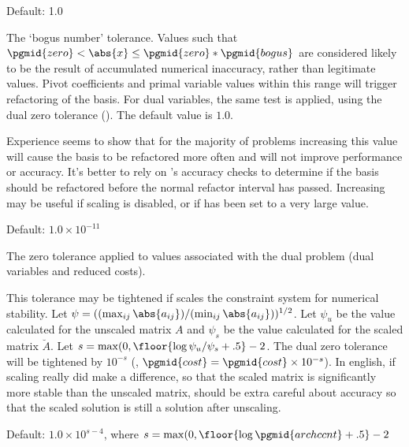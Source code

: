 \begin{codedoc}
  \item{}
    \kw{;}

  Default: 1.0

  The `bogus number' tolerance.
  Values such that $\pgmid{zero} < \abs{x} \le \pgmid{zero}*\pgmid{bogus}$
  are considered likely to be the result of accumulated numerical inaccuracy,
  rather than legitimate values.
  Pivot coefficients and primal variable values within this range
  will trigger refactoring of the basis.
  For dual variables, the same test is applied, using the dual zero
  tolerance ().
  The default value is $1.0$.

  Experience seems to show that for the majority of problems
  increasing this value will cause the basis to be refactored more
  often and will not improve performance or accuracy.
  It's better to rely on \dylp's accuracy checks to determine if the basis
  should be refactored before the normal refactor interval has passed.
  Increasing  may be useful if scaling is disabled,
  or if  has been set to a very large value.

  \item{}
    \kw{;}

  Default: $1.0\times10^{-11}$

  The zero tolerance applied to values associated with the dual problem
  (dual variables and reduced costs).

  This tolerance may be tightened if \dylp scales the constraint system for
  numerical stability.
  Let $\psi = ((\max_{ij} \abs{a_{ij}})/(\min_{ij} \abs{a_{ij}}))^{1/2}$.
  Let $\psi_u$ be the value calculated for the unscaled matrix $A$ and
  $\psi_s$ be the value calculated for the scaled matrix $\breve{A}$.
  Let $s = \max (0, \floor{\log \psi_u/\psi_s + .5}-2$.
  The dual zero tolerance will be tightened by $10^{-s}$
  (\ie, $\pgmid{cost} = \pgmid{cost} \times 10^{-s}$).
  In english, if scaling really did make a
  difference, so that the scaled matrix is significantly more stable than the
  unscaled matrix, \dylp should be extra careful about accuracy so that the
  scaled solution is still a solution after unscaling.

  \item{}
    \kw{;}

  Default: $1.0 \times 10^{s-4}$,
      where $s = \max (0, \floor{\log \pgmid{archccnt} + .5}-2$


\end{codedoc}
